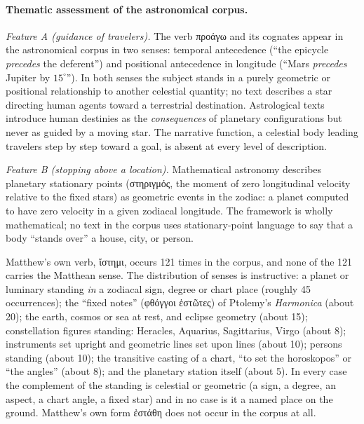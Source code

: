\documentclass[11pt,a4paper]{article}
\newcommand{\grk}[1]{{\fontencoding{LGR}\selectfont #1}}
\newcommand{\grk}[1]{{\greekfont #1}}
\begin{document}
\paragraph{Thematic assessment of the astronomical corpus.}

\textit{Feature A (guidance of travelers).}
The verb \grk{προάγω} and its cognates appear in the astronomical corpus
in two senses: temporal antecedence (``the epicycle \emph{precedes} the
deferent'') and positional antecedence in longitude (``Mars \emph{precedes}
Jupiter by $15^\circ$''). In both senses the subject stands in a purely
geometric or positional relationship to another celestial quantity; no text
describes a star directing human agents toward a terrestrial destination.
Astrological texts introduce human destinies as the \emph{consequences} of
planetary configurations but never as guided by a moving star. The narrative
function, a celestial body leading travelers step by step toward a goal, is
absent at every level of description.

\textit{Feature B (stopping above a location).}
Mathematical astronomy describes planetary stationary points
(\grk{στηριγμός}, the moment of zero longitudinal velocity relative to the
fixed stars) as geometric events in the zodiac: a planet computed to have
zero velocity in a given zodiacal longitude. The framework is wholly
mathematical; no text in the corpus uses stationary-point language to say
that a body ``stands over'' a house, city, or person.

Matthew's own verb, \grk{ἵστημι}, occurs 121 times in the corpus, and none
of the 121 carries the Matthean sense. The distribution of senses is
instructive: a planet or luminary standing \emph{in} a zodiacal sign, degree
or chart place (roughly 45 occurrences); the ``fixed notes''
(\grk{φθόγγοι ἑστῶτες}) of Ptolemy's \textit{Harmonica} (about 20); the
earth, cosmos or sea at rest, and eclipse geometry (about 15); constellation
figures standing: Heracles, Aquarius, Sagittarius, Virgo (about 8);
instruments set upright and geometric lines set upon lines (about 10);
persons standing (about 10); the transitive casting of a chart, ``to set the
horoskopos'' or ``the angles'' (about 8); and the planetary station itself
(about 5). In every case the complement of the standing is celestial or
geometric (a sign, a degree, an aspect, a chart angle, a fixed star) and
in no case is it a named place on the ground. Matthew's own form
\grk{ἐστάθη} does not occur in the corpus at all.
\end{document}
